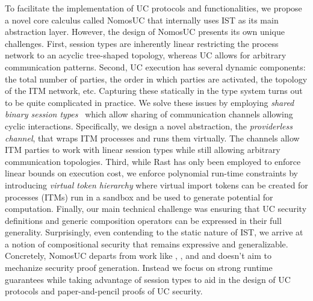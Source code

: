 To facilitate the implementation of UC protocols and functionalities, we propose a novel core calculus called NomosUC that
internally uses IST as its main abstraction layer.
However, the design of NomosUC presents its own unique challenges.
First, session types are inherently linear restricting the process network to an acyclic tree-shaped topology,
whereas UC allows for arbitrary communication patterns.
Second, UC execution has several dynamic components: the total number of parties, the order in which parties are activated,
the topology of the ITM network, etc.
Capturing these statically in the type system turns out to be quite complicated in practice.
We solve these issues by employing \emph{shared binary session types}~\cite{balzer2017manifest} which allow sharing
of communication channels allowing cyclic interactions.
Specifically, we design a novel abstraction, the \emph{providerless channel}, that wraps ITM processes and runs them virtually.
The channels allow ITM parties to work with linear session types while still allowing arbitrary communication topologies.
Third, while Rast has only been employed to enforce linear bounds on execution cost, we enforce polynomial run-time constraints by introducing 
\emph{virtual token hierarchy} where virtual import tokens can be created for processes (ITMs) run in a sandbox and be used to generate potential for computation. 
Finally, our main technical challenge was ensuring that UC security definitions and generic composition operators
can be expressed in their full generality.
Surprisingly, even contending to the static nature of IST, we arrive at a notion of compositional security that remains expressive and generalizable.
Concretely, NomosUC departs from work like \cite{easyuc}, \cite{barbosa}, and \cite{ipdl} and doesn't aim to mechanize security proof generation.
Instead we focus on strong runtime guarantees while taking advantage of session types to aid in the design of UC protocols and paper-and-pencil proofs of UC security.

